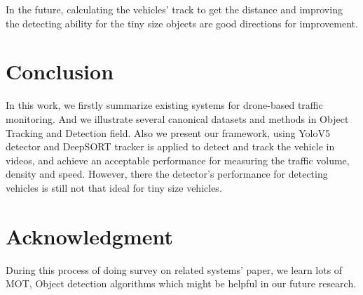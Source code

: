 \documentclass[10pt,twocolumn,letterpaper]{article}  %
\begin{document}
In the future, calculating the vehicles' track to get the distance and improving the detecting ability for the tiny size objects are good directions for improvement.


\section{Conclusion}
\label{section:conclusion}
In this work, we firstly summarize existing systems for drone-based traffic monitoring. And we illustrate several canonical datasets and methods in Object Tracking and Detection field. Also we present our framework, using YoloV5 detector and DeepSORT tracker is applied to detect and track the vehicle in videos, and achieve an acceptable performance for measuring the traffic volume, density and speed. However, there  the detector's performance for detecting vehicles is still not that ideal for tiny size vehicles. 

\section*{Acknowledgment}
During this process of doing survey on related systems' paper, we learn lots of MOT, Object detection algorithms which might be helpful in our future research.


{\small
	
	
}
\end{document}
